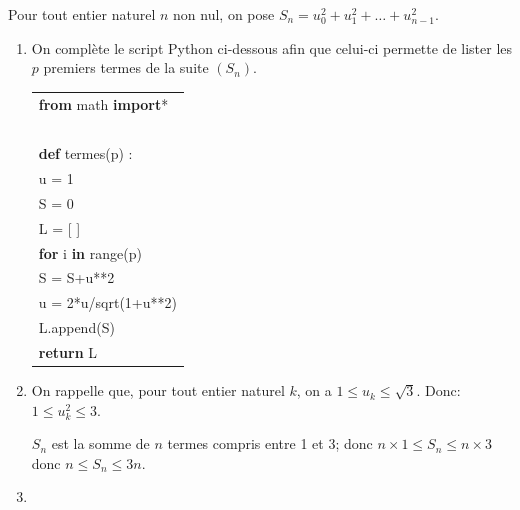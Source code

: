 \documentclass[10pt]{article}
\providecommand{\blue}{\color{blue}}
\providecommand{\blue}{\color{blue}}
\providecommand{\ds}{\displaystyle}
\begin{document}
Pour tout entier naturel $n$ non nul, on pose $S_n = u_0^2 + u_1^2 + \ldots + u_{n-1}^2$.

\medskip

\begin{enumerate}
\item On complète le script Python ci-dessous afin que celui-ci permette de lister les $p$ premiers termes de la suite $(S_n)$.

\begin{center}
\begin{ttfamily}
\begin{tabular}{|l|}\hline
\textbf{from} math \textbf{import}*\\
~\\
\textbf{def} termes(p) :\\
\qquad  u = \blue 1\\
\qquad  S = 0\\
\qquad  L = [ ]\\
\qquad  \textbf{for} i \textbf{in} range(p)\\
\qquad \qquad S = \blue{}S+u**2\\
\qquad \qquad u = \blue{}2*u/sqrt(1+u**2)\\
\qquad \qquad L.append(S) \\
\qquad \textbf{return} L\\ \hline
\end{tabular}
\end{ttfamily}
\end{center}








\item On rappelle que, pour tout entier naturel $k$, on a $1 \leqslant u_k \leqslant \sqrt 3$. Donc: $1 \leqslant u_k^2 \leqslant 3$.

$S_n$ est la somme de $n$ termes compris entre 1 et 3; donc $n\times 1 \leqslant S_n \leqslant n\times 3$ donc $n \leqslant S_n \leqslant 3n$.



\item
{}

\end{enumerate}

\medskip
\end{document}
